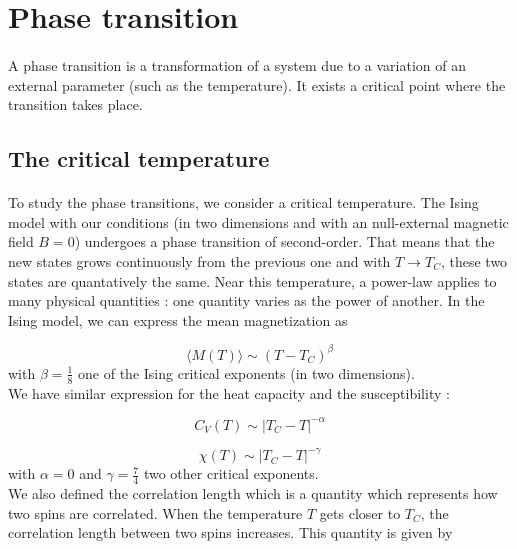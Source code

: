 \documentclass[a4paper, twoside, 11pt]{report}
\theoremstyle{theorem}
\theoremstyle{remark}
\theoremstyle{exemple}
\begin{document}
    \section{Phase transition}
    
        \paragraph{}A phase transition is a transformation of a system due to a variation of an external parameter (such as the temperature). It exists a critical point where the transition takes place. 
    
        \subsection{The critical temperature}
        
            \paragraph{}To study the phase transitions, we consider a critical temperature. The Ising model with our conditions (in two dimensions and with an null-external magnetic field $B=0$) undergoes a phase transition of second-order. That means that the new states grows continuously from the previous one and with $T \rightarrow T_C$, these two states are quantatively the same. Near this temperature, a power-law applies to many physical quantities : one quantity varies as the power of another. In the Ising model, we can express the mean magnetization as 
                
                \begin{equation*}
                    \langle M(T)\rangle \sim (T-T_C)^{\beta}
                \end{equation*}
            with $\displaystyle \beta = \frac{1}{8}$ one of the Ising critical exponents (in two dimensions).\\
            We have similar expression for the heat capacity and the susceptibility : 
            
                \begin{equation*}
                    C_V(T) \sim |T_C - T | ^{-\alpha}
                \end{equation*}
                
                \begin{equation*}
                    \chi(T) \sim |T_C - T |^{-\gamma}
                \end{equation*}
            with $\displaystyle \alpha = 0$ and $\displaystyle \gamma=\frac{7}{4}$ two other critical exponents.\\
            We also defined the correlation length which is a quantity which represents how two spins are correlated. When the temperature $T$ gets closer to $T_C$, the correlation length between two spins increases. This quantity is given by 
            
\end{document}

